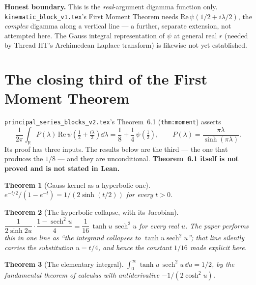 \documentclass{report}
\newtheorem{theorem}{Theorem}[chapter]
\theoremstyle{definition}
\begin{document}
\textbf{Honest boundary.} This is the \emph{real}-argument digamma function only.
\texttt{kinematic\_block\_v1.tex}'s First Moment Theorem needs $\mathrm{Re}\,
\psi(1/2+i\lambda/2)$, the \emph{complex} digamma along a vertical line --- a further,
separate extension, not attempted here. The Gauss integral representation of $\psi$ at
general real $r$ (needed by Thread HT's Archimedean Laplace transform) is likewise not yet
established.

\section{The closing third of the First Moment Theorem}

\texttt{principal\_series\_blocks\_v2.tex}'s Theorem~6.1 (\texttt{thm:moment}) asserts
\[
  \frac{1}{2\pi}\int_{\mathbb{R}} P(\lambda)\,
  \mathrm{Re}\,\psi\!\left(\tfrac12+\tfrac{i\lambda}{2}\right)\dd\lambda
  = \frac18 + \frac14\,\psi\!\left(\tfrac12\right),
  \qquad P(\lambda)=\frac{\pi\lambda}{\sinh(\pi\lambda)} .
\]
Its proof has three inputs. The results below are the third --- the one that produces the
$1/8$ --- and they are unconditional. \textbf{Theorem~6.1 itself is not proved and is not
stated in Lean.}

\begin{theorem}[Gauss kernel as a hyperbolic one]
  \label{thm:fm-exp-sinh}
  \leanok
  $e^{-t/2}/(1-e^{-t}) = 1/(2\sinh(t/2))$ for every $t>0$.
\end{theorem}

\begin{theorem}[The hyperbolic collapse, with its Jacobian]
  \label{thm:fm-collapse}
  \leanok
  $\dfrac{1}{2\sinh 2u}\cdot\dfrac{1-\operatorname{sech}^2u}{4}
   = \dfrac{1}{16}\,\tanh u\,\operatorname{sech}^2u$ for every real $u$.
  The paper performs this in one line as ``the integrand collapses to
  $\tanh u\operatorname{sech}^2u$''; that line silently carries the substitution $u=t/4$,
  and hence the constant $1/16$ made explicit here.
\end{theorem}

\begin{theorem}[The elementary integral]
  \label{thm:fm-tanh-sech}
  \leanok
  $\int_0^\infty \tanh u\,\operatorname{sech}^2u\,\dd u = 1/2$, by the fundamental theorem
  of calculus with antiderivative $-1/(2\cosh^2 u)$.
\end{theorem}
\end{document}
